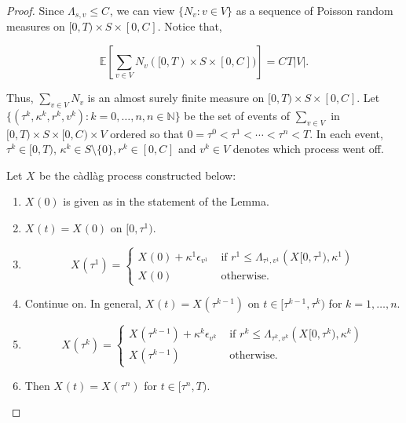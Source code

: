 \documentclass[12pt]{article}
\newcommand{\mb}{\mathbb}
\newcommand{\te}{\text}
\newcommand{\ep}{\epsilon}
\newcommand{\ind}{\hspace{24pt}}
\newcommand{\ex}[1]{\mb{E}\left[#1\right]}			%
\renewcommand{\v}{v}							%
\renewcommand{\S}{S}							%
\newcommand{\ev}[1]{\ep_{#1}}					%
\newcommand{\T}{T}								%
\renewcommand{\t}{t}							%
\newcommand{\poiss}[1]{N_{#1}}						%
\newcommand{\V}{V}									%
\renewcommand{\tt}{s}								%
\renewcommand{\r}{r}								%
\newcommand{\rt}[1]{\tau^{#1}}						%
\renewcommand{\it}{k}								%
\newcommand{\numb}{n}								%
\newcommand{\rxvt}[2]{X_{#1}{(#2)}}					%
\newcommand{\rxvts}[2]{X_{#1}{#2}}					%
\newcommand{\ratee}[1]{\Lambda_{#1}}				%
\newcommand{\const}[1]{C_{#1}}						%
\renewcommand{\mark}[1]{\kappa^{#1}}				%
\begin{document}
\begin{proof}
Since \(\ratee{\tt,\v} \leq \const{}\), we can view \(\{\poiss{\v}:\v\in\V\}\) as a sequence of Poisson random measures on \([0,\T)\times \S\times [0,\const{}]\). Notice that,

\[\ex{\sum_{\v\in\V}\poiss{\v}([0,\T)\times\S\times[0,\const{}])} = \const{}\T|\V|.\]

Thus, \(\sum_{\v\in\V}\poiss{\v}\) is an almost surely finite measure on \([0,\T)\times \S\times [0,\const{}]\). Let \(\{(\rt{\it},\mark{\it},\r^\it,\v^\it):\it = 0,\dots,\numb, \numb\in \mb{N}\}\) be the set of events of \(\sum_{\v\in\V}\) in \([0,\T)\times\S\times [0,\const{})\times \V\) ordered so that \(0=\rt{0} < \rt{1} < \cdots < \rt{\numb} < \T\). In each event, \(\rt{\it} \in [0,\T)\), \(\mark{\it}\in \S\setminus\{0\}, \r^\it \in [0,\const{}]\) and \(\v^\it \in \V\) denotes which process went off.

\ind Let \(\rxvts{}{}\) be the c\`adl\`ag process constructed below:

\begin{enumerate}
\item \(\rxvt{}{0}\) is given as in the statement of the Lemma.

\item \(\rxvt{}{\t} = \rxvt{}{0}\) on \([0,\rt{1})\).

\item 

\[\rxvt{}{\rt{1}} = \begin{cases}
\rxvt{}{0} + \mark{1}\ev{\v^1} &\te{ if } \r^1 \leq \ratee{\rt{1},\v^1}(\rxvts{}{[0,\rt{1})},\mark{1})\\
\rxvt{}{0} &\te{ otherwise.}
\end{cases}
\] 

\item Continue on. In general, \(\rxvt{}{\t} = \rxvt{}{\rt{\it-1}}\) on \(\t \in [\rt{\it-1},\rt{\it})\) for \(\it= 1,\dots,\numb\).

\item 

\[\rxvt{}{\rt{\it}} = \begin{cases}
\rxvt{}{\rt{\it-1}} + \mark{\it}\ev{\v^\it} &\te{ if } \r^\it \leq \ratee{\rt{\it},\v^\it}(\rxvts{}{[0,\rt{\it})},\mark{\it})\\
\rxvt{}{\rt{\it-1}} &\te{ otherwise.}
\end{cases}\]

\item Then \(\rxvt{}{\t} = \rxvt{}{\rt{\numb}}\) for \(\t\in [\rt{\numb},\T)\).
\end{enumerate}


\end{proof}
\end{document}
